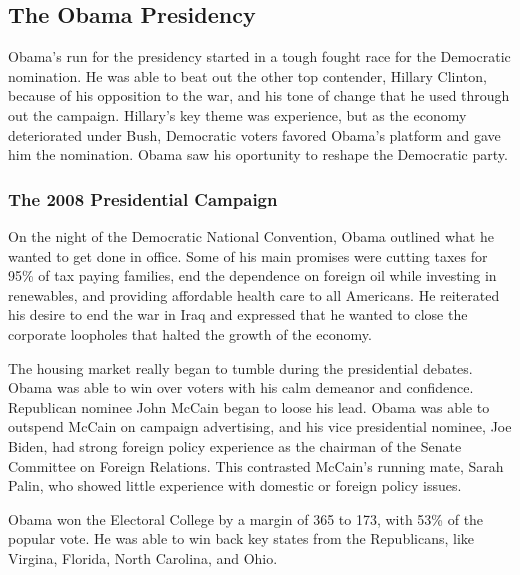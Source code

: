 \documentclass{article}
\begin{document}
    \subsection{The Obama Presidency}
    Obama's run for the presidency started in a tough fought race for the Democratic nomination. He was able to beat out the other top contender, Hillary Clinton, because of his opposition to the war, and his tone of change that he used through out the campaign. Hillary's key theme was experience, but as the economy deteriorated under Bush, Democratic voters favored Obama's platform and gave him the nomination. Obama saw his oportunity to reshape the Democratic party.

        \subsubsection{The 2008 Presidential Campaign}
        On the night of the Democratic National Convention, Obama outlined what he wanted to get done in office. Some of his main promises were cutting taxes for 95\% of tax paying families, end the dependence on foreign oil while investing in renewables, and providing affordable health care to all Americans. He reiterated his desire to end the war in Iraq and expressed that he wanted to close the corporate loopholes that halted the growth of the economy.\cite{obamacampaign2008}
        \par
        The housing market really began to tumble during the presidential debates. Obama was able to win over voters with his calm demeanor and confidence. Republican nominee John McCain began to loose his lead. Obama was able to outspend McCain on campaign advertising, and his vice presidential nominee, Joe Biden, had strong foreign policy experience as the chairman of the Senate Committee on Foreign Relations. This contrasted McCain's running mate, Sarah Palin, who showed little experience with domestic or foreign policy issues.\cite{obamacampaign2008}
        \par
        Obama won the Electoral College by a margin of 365 to 173, with 53\% of the popular vote. He was able to win back key states from the Republicans, like Virgina, Florida, North Carolina, and Ohio.
\end{document}
